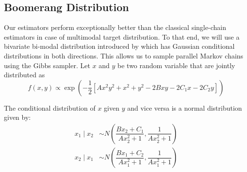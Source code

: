 \documentclass[11pt]{article}
\theoremstyle{remark}
\begin{document}
\subsection{Boomerang Distribution} \label{ex:boomerang}

Our estimators perform exceptionally better than the classical single-chain estimators in case of multimodal target distribution. To that end, we will use a bivariate bi-modal distribution introduced by \cite{gelman1991note} which has Gaussian conditional distributions in both directions. This allows us to sample parallel Markov chains using the Gibbs sampler. Let $x$ and $y$ be two random variable that are jointly distributed as 
%
\[
f(x, y) \propto \exp\left(-\dfrac{1}{2} \left[Ax^2y^2 + x^2 + y^2 -2Bxy  -2C_1x - 2C_2y  \right]\right)
\]

The conditional distribution of $x$ given $y$ and vice versa is a normal distribution given by:
%
\begin{align*}
    x_1 \mid x_2 &\sim N\left(\dfrac{Bx_2 + C_1}{Ax_2^2 + 1}, \dfrac{1}{Ax_2^2 + 1}\right)\\
    x_2 \mid x_1 &\sim N\left(\dfrac{Bx_1 + C_2}{Ax_1^2 + 1}, \dfrac{1}{Ax_1^2 + 1}\right)
\end{align*}
\end{document}

